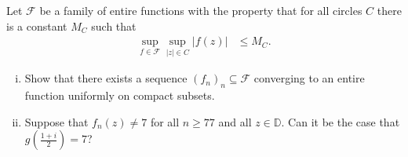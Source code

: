 \documentclass[10pt]{mypackage}
\renewcommand{\D}{\mathbb{D}}
\begin{document}
\begin{problem}[Problem 5]
  Let $\mathcal{F}$ be a family of entire functions with the property that for all circles $C$ there is a constant $M_C$ such that
  \begin{align*}
    \sup_{f\in \mathcal{F}}\sup_{|z| \in C} \left\vert f(z) \right\vert &\leq M_C.
  \end{align*}
  \begin{enumerate}[(i)]
    \item Show that there exists a sequence $\left( f_n \right)_n\subseteq \mathcal{F}$ converging to an entire function uniformly on compact subsets.
    \item Suppose that $f_n(z) \neq 7$ for all $n\geq 77$ and all $z\in \D$. Can it be the case that $g\left( \frac{1+i}{2} \right) = 7$?
  \end{enumerate}
\end{problem}
\end{document}
